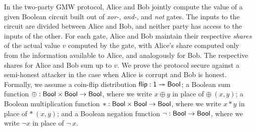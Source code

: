 \renewcommand{\flip}{\mathsf{flip}}
\newcommand{\circuit}{\mathsf{circuit}}
\newcommand{\inputgate}{\textit{input-gate}}
\newcommand{\xorgate}{\textit{xor-gate}}
\newcommand{\andgate}{\textit{and-gate}}
\newcommand{\notgate}{\textit{not-gate}}
\renewcommand{\id}{\mathsf{id}}
\renewcommand{\adv}{\mathsf{adv}}
\newcommand{\A}{\mathsf{A}}
\renewcommand{\Alice}{\mathsf{Alice}}
\newcommand{\AliceOk}{\mathsf{AliceOk}}
\newcommand{\B}{\mathsf{B}}
\renewcommand{\Bob}{\mathsf{Bob}}
\newcommand{\BobOk}{\mathsf{BobOk}}
\newcommand{\Adv}{\mathsf{Adv}}
\newcommand{\BobOTBits}{\mathsf{BobOTBits}}
\renewcommand{\In}{\mathsf{In}}
\newcommand{\InOk}{\mathsf{InOk}}
\renewcommand{\Out}{\mathsf{Out}}
\newcommand{\Wire}{\mathsf{Wire}}
\newcommand{\InputShare}{\mathsf{InputShare}}
\newcommand{\Share}{\mathsf{Share}}
\newcommand{\InputShareOk}{\mathsf{InputShareOk}}
\newcommand{\ShareOk}{\mathsf{ShareOk}}
\newcommand{\LocalBitOk}{\mathsf{LocalBitOk}}
\newcommand{\OTBitOk}{\mathsf{OTBitOk}}
\newcommand{\ObliviousTransfer}{\mathsf{1OutOf4OT}}
\newcommand{\OTBit}{\mathsf{OTBit}}
\renewcommand{\OTMsg}{\mathsf{OTMsg}}
\renewcommand{\OTChoice}{\mathsf{OTChoice}}
\renewcommand{\OTOut}{\mathsf{OTOut}}
\newcommand{\SendInputShare}{\mathsf{SendInputShare}}
\newcommand{\SendFinalShare}{\mathsf{SendFinalShare}}
\newcommand{\LeakIn}{\mathsf{In}}
\newcommand{\LeakInRcvd}{\mathsf{InRcvd}}
\renewcommand{\LeakOut}{\mathsf{Out}}
\newcommand{\LeakInputShare}{\mathsf{InputShare}}
\newcommand{\LeakShare}{\mathsf{Share}}
\newcommand{\LeakSendInputShare}{\mathsf{SendInputShare}}
\newcommand{\LeakSendFinalShare}{\mathsf{SendFinalShare}}
\newcommand{\LeakOTBit}{\mathsf{OTBit}}
\newcommand{\LeakOTMsg}{\mathsf{OTMsg}}
\newcommand{\LeakOTChoiceRcvd}{\mathsf{OTChoiceRcvd}}
\newcommand{\Sim}{\mathsf{Sim}}
\newcommand{\Wires}{\mathsf{Wires}}
\newcommand{\Real}{\mathsf{Real}}

In the two-party GMW protocol, Alice and Bob jointly compute the value of a given Boolean circuit built out of \emph{xor-}, \emph{and-}, and \emph{not} gates. The inputs to the circuit are divided between Alice and Bob, and neither party has access to the inputs of the other. For each gate, Alice and Bob maintain their respective \emph{shares} of the actual value $v$ computed by the gate, with Alice's share computed only from the information available to Alice, and analogously for Bob. The respective shares for Alice and Bob sum up to $v$. We prove the protocol secure against a semi-honest attacker in the case when Alice is corrupt and Bob is honest. Formally, we assume a coin-flip distribution $\flip : \one \twoheadrightarrow \Bool$; a Boolean sum function $\oplus : \mathsf{Bool} \times \mathsf{Bool} \rightarrow \mathsf{Bool}$, where we write $x \oplus y$ in place of $\oplus \ (x,y)$; a Boolean multiplication function $* : \mathsf{Bool} \times \mathsf{Bool} \rightarrow \mathsf{Bool}$, where we write $x * y$ in place of $* \ (x,y)$; and a Boolean negation function $\neg : \mathsf{Bool} \rightarrow \mathsf{Bool}$, where we write $\neg x$ in place of $\neg \ x$. \smallskip

